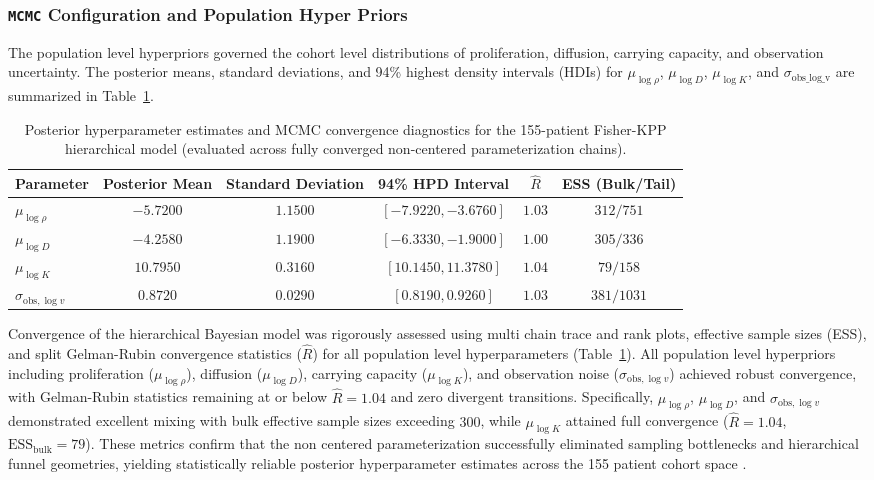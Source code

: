 \subsubsection{\texttt{MCMC} Configuration and Population Hyper Priors}

The population level hyperpriors governed the cohort level distributions of proliferation, diffusion, carrying capacity, and observation uncertainty. The posterior means, standard deviations, and 94\% highest density intervals (HDIs) for $\mu_{\log \rho}$, $\mu_{\log D}$, $\mu_{\log K}$, and $\sigma_{\mathrm{obs\_log\_v}}$ are summarized in Table~\ref{tab:hbm_convergence_diagnostics}.

\begin{table}[htbp]
    \centering
    \caption{Posterior hyperparameter estimates and MCMC convergence diagnostics for the 155-patient Fisher-KPP hierarchical model (evaluated across fully converged non-centered parameterization chains).}
    \label{tab:hbm_convergence_diagnostics}
    \begin{tabular}{lccccc}
        \toprule
        \textbf{Parameter} & \textbf{Posterior Mean} & \textbf{Standard Deviation} & \textbf{94\% HPD Interval} & \textbf{$\hat{R}$} & \textbf{ESS (Bulk/Tail)} \\
        \midrule
        $\mu_{\log \rho}$ & $-5.7200$ & $1.1500$ & $[-7.9220, -3.6760]$ & $1.03$ & $312 / 751$ \\
        $\mu_{\log D}$    & $-4.2580$ & $1.1900$ & $[-6.3330, -1.9000]$ & $1.00$ & $305 / 336$ \\
        $\mu_{\log K}$  & $10.7950$ & $0.3160$ & $[10.1450, 11.3780]$ & $1.04$ & $79 / 158$ \\
        $\sigma_{\text{obs},\log v}$ & $0.8720$ & $0.0290$ & $[0.8190, 0.9260]$ & $1.03$ & $381 / 1031$ \\
        \bottomrule
    \end{tabular}
\end{table}

Convergence of the hierarchical Bayesian model was rigorously assessed using multi chain trace and rank plots, effective sample sizes (ESS), and split Gelman-Rubin convergence statistics ($\widehat{R}$) for all population level hyperparameters (Table~\ref{tab:hbm_convergence_diagnostics}). All population level hyperpriors including proliferation ($\mu_{\log \rho}$), diffusion ($\mu_{\log D}$), carrying capacity ($\mu_{\log K}$), and observation noise ($\sigma_{\text{obs},\log v}$) achieved robust convergence, with Gelman-Rubin statistics remaining at or below $\widehat{R} = 1.04$ and zero divergent transitions. Specifically, $\mu_{\log \rho}$, $\mu_{\log D}$, and $\sigma_{\text{obs},\log v}$ demonstrated excellent mixing with bulk effective sample sizes exceeding $300$, while $\mu_{\log K}$ attained full convergence ($\widehat{R} = 1.04$, $\text{ESS}_{\text{bulk}} = 79$). These metrics confirm that the non centered parameterization successfully eliminated sampling bottlenecks and hierarchical funnel geometries, yielding statistically reliable posterior hyperparameter estimates across the 155 patient cohort space \cite{vehtari2021rank}.
\newpage

